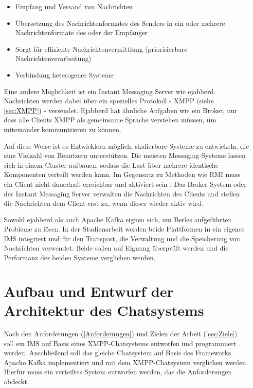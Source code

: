 \documentclass[a4paper,titlepage,halfparskip,12pt]{scrreprt}
\begin{document}
\begin{onehalfspacing}
\begin{itemize}
\item Empfang und Versand von Nachrichten
\item Übersetzung des Nachrichtenformates des Senders in ein oder mehrere Nachrichtenformate des oder der Empfänger
\item Sorgt für effiziente Nachrichtenvermittlung (priorisierbare Nachrichtenverarbeitung)
\item Verbindung heterogener Systeme
\end{itemize}

Eine andere Möglichkeit ist ein Instant Messaging Server wie ejabberd. Nachrichten werden dabei über ein spezielles Protokoll - \ac{XMPP} (siehe \autoref{sec:XMPP}) - versendet. Ejabberd hat ähnliche Aufgaben wie ein Broker, nur dass alle Clients \acs{XMPP} als gemeinsame Sprache verstehen müssen, um miteinander kommunizieren zu können.

Auf diese Weise ist es Entwicklern möglich, skalierbare Systeme zu entwickeln, die eine Vielzahl von Benutzern unterstützen. Die meisten Messaging Systeme lassen sich in einem Cluster aufbauen, sodass die Last über mehrere identische Komponenten verteilt werden kann. Im Gegensatz zu Methoden wie \ac{RMI} muss ein Client nicht dauerhaft erreichbar und aktiviert sein \cite{andrew2008verteilte}. Das Broker System oder der Instant Messaging Server verwalten die Nachrichten des Clients und stellen die Nachrichten dem Client erst zu, wenn dieser wieder aktiv wird.

Sowohl ejabberd als auch Apache Kafka eignen sich, um Berles aufgeführten Probleme zu lösen. In der Studienarbeit werden beide Plattformen in ein eigenes \ac{IMS} integriert und für den Transport, die Verwaltung und die Speicherung von Nachrichten verwendet. Beide sollen auf Eignung überprüft werden und die Performanz der beiden Systeme verglichen werden.

\pagebreak


\chapter{Aufbau und Entwurf der Architektur des Chatsystems}
\label{chap:Architektur}

Nach den Anforderungen (\autoref{Anforderungen}) und Zielen der Arbeit (\autoref{sec:Ziele}) soll ein \ac{IMS} auf Basis eines \ac{XMPP}-Chatsystems entworfen und programmiert werden. Anschließend soll das gleiche Chatsystem auf Basis des Frameworks Apache Kafka implementiert und mit dem \ac{XMPP}-Chatsystem verglichen werden. Hierfür muss ein verteiltes System entworfen werden, das die Anforderungen abdeckt.


\end{onehalfspacing}
\end{document}
